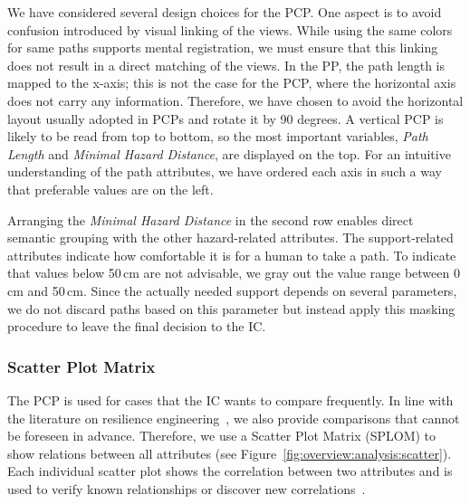 \documentclass{egpubl}
\begin{document}
We have considered several design choices for the PCP. One aspect is to avoid confusion introduced by visual linking of the views. While using the same colors for same paths supports mental registration, we must ensure that this linking does not result in a direct matching of the views. In the PP, the path length is mapped to the x-axis; this is not the case for the PCP, where the horizontal axis does not carry any information. Therefore, we have chosen to avoid the horizontal layout usually adopted in PCPs and rotate it by 90 degrees. A vertical PCP is likely to be read from top to bottom, so the most important variables, \emph{Path Length} and \emph{Minimal Hazard Distance}, are displayed on the top. For an intuitive understanding of the path attributes, we have ordered each axis in such a way that preferable values are on the left. 

Arranging the \emph{Minimal Hazard Distance} in the second row enables direct semantic grouping with the other hazard-related attributes. The support-related attributes indicate how comfortable it is for a human to take a path. To indicate that values below 50\,cm are not advisable, we gray out the value range between 0\,cm and 50\,cm. Since the actually needed support depends on several parameters, we do not discard paths based on this parameter but instead apply this masking procedure to leave the final decision to the IC.

\subsubsection{Scatter Plot Matrix} \label{sec:overview:analysis:scatter}
The PCP is used for cases that the IC wants to compare frequently. In line with the literature on resilience engineering~\cite{Lundberg2012}, we also provide comparisons that cannot be foreseen in advance. Therefore, we use a Scatter Plot Matrix (SPLOM) to show relations between all attributes (see Figure~\ref{fig:overview:analysis:scatter}). Each individual scatter plot shows the correlation between two attributes and is used to verify known relationships or discover new correlations~\cite{Li2008}.
\end{document}
